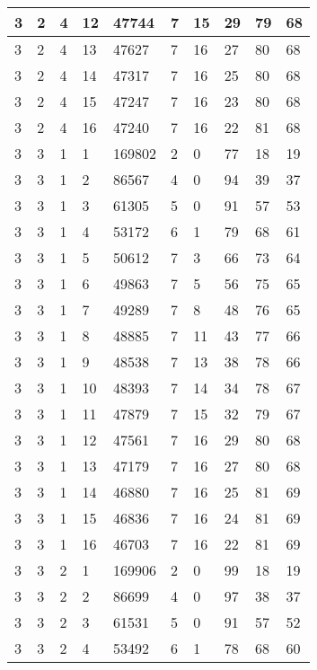 \begin{table}[!ht]
\begin{tabular}{|l|l|l|l|l|l|l|l|l|l|}
        3 & 2 & 4 & 12 & 47744 & 7 & 15 & 29 & 79 & 68 \\ \hline
        3 & 2 & 4 & 13 & 47627 & 7 & 16 & 27 & 80 & 68 \\ \hline
        3 & 2 & 4 & 14 & 47317 & 7 & 16 & 25 & 80 & 68 \\ \hline
        3 & 2 & 4 & 15 & 47247 & 7 & 16 & 23 & 80 & 68 \\ \hline
        3 & 2 & 4 & 16 & 47240 & 7 & 16 & 22 & 81 & 68 \\ \hline
        3 & 3 & 1 & 1 & 169802 & 2 & 0 & 77 & 18 & 19 \\ \hline
        3 & 3 & 1 & 2 & 86567 & 4 & 0 & 94 & 39 & 37 \\ \hline
        3 & 3 & 1 & 3 & 61305 & 5 & 0 & 91 & 57 & 53 \\ \hline
        3 & 3 & 1 & 4 & 53172 & 6 & 1 & 79 & 68 & 61 \\ \hline
        3 & 3 & 1 & 5 & 50612 & 7 & 3 & 66 & 73 & 64 \\ \hline
        3 & 3 & 1 & 6 & 49863 & 7 & 5 & 56 & 75 & 65 \\ \hline
        3 & 3 & 1 & 7 & 49289 & 7 & 8 & 48 & 76 & 65 \\ \hline
        3 & 3 & 1 & 8 & 48885 & 7 & 11 & 43 & 77 & 66 \\ \hline
        3 & 3 & 1 & 9 & 48538 & 7 & 13 & 38 & 78 & 66 \\ \hline
        3 & 3 & 1 & 10 & 48393 & 7 & 14 & 34 & 78 & 67 \\ \hline
        3 & 3 & 1 & 11 & 47879 & 7 & 15 & 32 & 79 & 67 \\ \hline
        3 & 3 & 1 & 12 & 47561 & 7 & 16 & 29 & 80 & 68 \\ \hline
        3 & 3 & 1 & 13 & 47179 & 7 & 16 & 27 & 80 & 68 \\ \hline
        3 & 3 & 1 & 14 & 46880 & 7 & 16 & 25 & 81 & 69 \\ \hline
        3 & 3 & 1 & 15 & 46836 & 7 & 16 & 24 & 81 & 69 \\ \hline
        3 & 3 & 1 & 16 & 46703 & 7 & 16 & 22 & 81 & 69 \\ \hline
        3 & 3 & 2 & 1 & 169906 & 2 & 0 & 99 & 18 & 19 \\ \hline
        3 & 3 & 2 & 2 & 86699 & 4 & 0 & 97 & 38 & 37 \\ \hline
        3 & 3 & 2 & 3 & 61531 & 5 & 0 & 91 & 57 & 52 \\ \hline
        3 & 3 & 2 & 4 & 53492 & 6 & 1 & 78 & 68 & 60 \\ \hline

\end{tabular}
\end{table}
